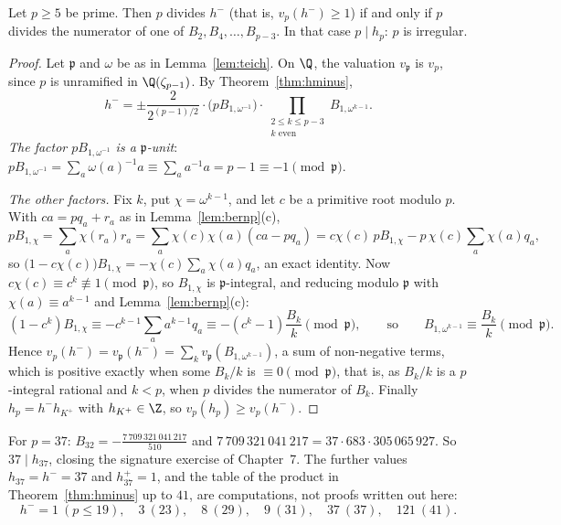 \begin{theorem}\label{thm:kummercrit}
Let $p\ge5$ be prime. Then $p$ divides $h^-$ (that is, $v_p(h^-)\ge1$) if and only if $p$ divides the numerator of one of $B_2,B_4,\dots,B_{p-3}$.
In that case $p\mid h_p$: $p$ is irregular.
\end{theorem}
\begin{proof}
Let $\mathfrak p$ and $\omega$ be as in Lemma~\ref{lem:teich}. On $\Q$, the valuation $v_{\mathfrak p}$ is $v_p$, since $p$ is unramified in
$\Q(\zeta_{p-1})$. By Theorem~\ref{thm:hminus},
\[
h^-=\pm\frac{2}{2^{(p-1)/2}}\cdot\bigl(pB_{1,\omega^{-1}}\bigr)\cdot\prod_{\substack{2\le k\le p-3\\ k\text{ even}}}B_{1,\omega^{k-1}}.
\]
\emph{The factor $pB_{1,\omega^{-1}}$ is a $\mathfrak p$-unit}: $pB_{1,\omega^{-1}}=\sum_a\omega(a)^{-1}a\equiv\sum_aa^{-1}a=p-1\equiv-1\pmod{\mathfrak p}$.

\emph{The other factors.} Fix $k$, put $\chi=\omega^{k-1}$, and let $c$ be a primitive root modulo $p$. With $ca=pq_a+r_a$ as in
Lemma~\ref{lem:bernp}(c),
\[
pB_{1,\chi}=\sum_a\chi(r_a)r_a=\sum_a\chi(c)\chi(a)(ca-pq_a)=c\chi(c)\,pB_{1,\chi}-p\,\chi(c)\sum_a\chi(a)q_a,
\]
so $\bigl(1-c\chi(c)\bigr)B_{1,\chi}=-\chi(c)\sum_a\chi(a)q_a$, an exact identity. Now $c\chi(c)\equiv c^k\not\equiv1\pmod{\mathfrak p}$, so
$B_{1,\chi}$ is $\mathfrak p$-integral, and reducing modulo $\mathfrak p$ with $\chi(a)\equiv a^{k-1}$ and Lemma~\ref{lem:bernp}(c):
\[
(1-c^k)B_{1,\chi}\equiv-c^{k-1}\sum_aa^{k-1}q_a\equiv-(c^k-1)\frac{B_k}k\pmod{\mathfrak p},\qquad\text{so}\qquad B_{1,\omega^{k-1}}\equiv\frac{B_k}k\pmod{\mathfrak p}.
\]
Hence $v_p(h^-)=v_{\mathfrak p}(h^-)=\sum_kv_{\mathfrak p}(B_{1,\omega^{k-1}})$, a sum of non-negative terms, which is positive exactly when some
$B_k/k$ is $\equiv0\pmod{\mathfrak p}$, that is, as $B_k/k$ is a $p$-integral rational and $k<p$, when $p$ divides the numerator of $B_k$.
Finally $h_p=h^-h_{K^+}$ with $h_{K^+}\in\Z$, so $v_p(h_p)\ge v_p(h^-)$.
\end{proof}

For $p=37$: $B_{32}=-\frac{7\,709\,321\,041\,217}{510}$ and $7\,709\,321\,041\,217=37\cdot683\cdot305\,065\,927$. So $37\mid h_{37}$, closing the
signature exercise of Chapter~7. The further values $h_{37}=h^-=37$ and $h_{37}^+=1$, and the table of the product in
Theorem~\ref{thm:hminus} up to $41$, are computations, not proofs written out here:
\[
h^-=1\ (p\le19),\quad 3\ (23),\quad 8\ (29),\quad 9\ (31),\quad 37\ (37),\quad 121\ (41).
\]

